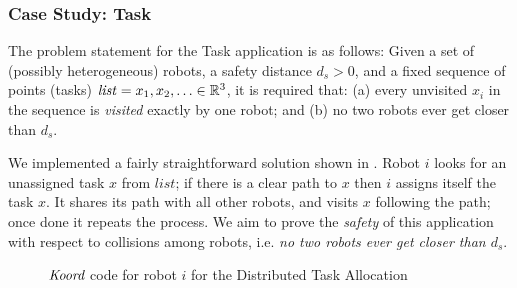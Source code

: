 
\newcommand{\Task}{\textsf{Task}\xspace}

\subsubsection{Case Study: \Task}
The problem statement for the \Task application is as follows: Given a set of (possibly heterogeneous) robots, a safety distance $d_s>0$, and a fixed sequence of points (tasks) $\mathit{list} = x_1, x_2, \ldots \in \reals^3$, it is required that: (a) every unvisited $x_i$ in the sequence is {\em visited\/} exactly by one robot; and (b) no two robots ever get closer than $d_s$.

We implemented a fairly straightforward solution shown in . Robot $i$ looks for an unassigned task $x$ from $\mathit{list}$; if there is a clear path to $x$ then $i$ assigns itself the task $x$. It shares its path with all other robots, and  visits $x$ following the path; once done it repeats the process.  We aim to prove the \emph{safety} of this application with respect to collisions among robots, i.e. \emph{no two robots ever get closer than $d_s$}.

\begin{figure}[t]
    {
    
    }
    {
    
    }
    \caption{ $\emph{Koord}$ code for robot $i$ for the Distributed Task Allocation}
    \label{fig:taskapp }
\end{figure}



